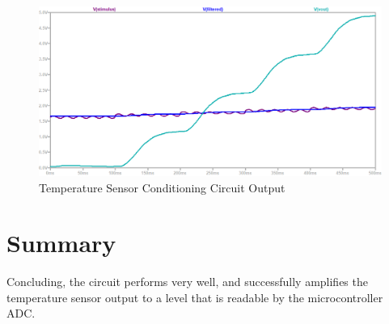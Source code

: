 \begin{figure}[h]
    \centering
    \includegraphics[width = 1\textwidth]{Figures/vout.png}
    \caption{Temperature Sensor Conditioning Circuit Output}
    \label{fig:vout}
\end{figure}


\pagebreak

\section{Summary}\label{sec:temp_summary}
Concluding, the circuit performs very well, and successfully amplifies the temperature sensor output to a level that is readable by the microcontroller ADC.


